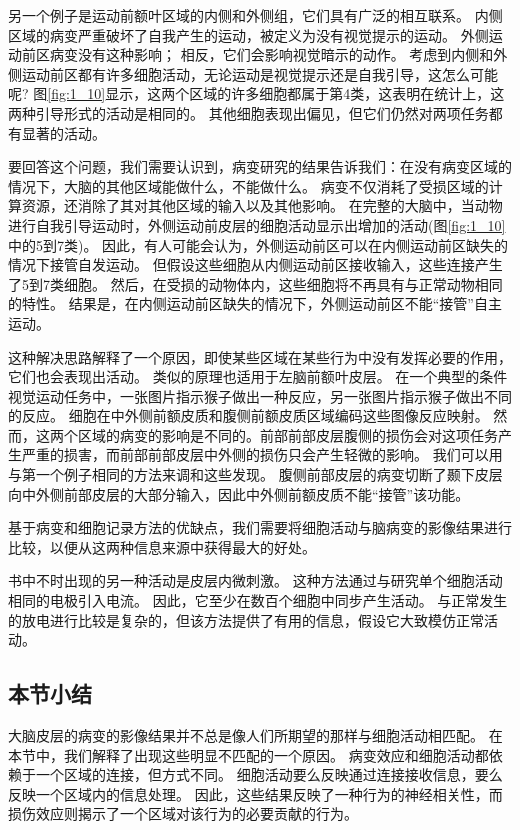 \par
另一个例子是运动前额叶区域的内侧和外侧组，它们具有广泛的相互联系\cite{luppino1993corticocortical}。
内侧区域的病变严重破坏了自我产生的运动，被定义为没有视觉提示的运动。
外侧运动前区病变没有这种影响\cite{thaler1995functions}；
相反，它们会影响视觉暗示的动作。
考虑到内侧和外侧运动前区都有许多细胞活动，无论运动是视觉提示还是自我引导，这怎么可能呢?
图\ref{fig:1_10}显示，这两个区域的许多细胞都属于第4类，这表明在统计上，这两种引导形式的活动是相同的。
其他细胞表现出偏见，但它们仍然对两项任务都有显著的活动。

\par
要回答这个问题，我们需要认识到，病变研究的结果告诉我们：在没有病变区域的情况下，大脑的其他区域能做什么，不能做什么。
病变不仅消耗了受损区域的计算资源，还消除了其对其他区域的输入以及其他影响。
在完整的大脑中，当动物进行自我引导运动时，外侧运动前皮层的细胞活动显示出增加的活动(图\ref{fig:1_10}中的5到7类)\cite{mushiake1991neuronal}。
因此，有人可能会认为，外侧运动前区可以在内侧运动前区缺失的情况下接管自发运动。
但假设这些细胞从内侧运动前区接收输入，这些连接产生了5到7类细胞。
然后，在受损的动物体内，这些细胞将不再具有与正常动物相同的特性。
结果是，在内侧运动前区缺失的情况下，外侧运动前区不能“接管”自主运动。

\par
这种解决思路解释了一个原因，即使某些区域在某些行为中没有发挥必要的作用，它们也会表现出活动。
类似的原理也适用于左脑前额叶皮层。
在一个典型的条件视觉运动任务中，一张图片指示猴子做出一种反应，另一张图片指示猴子做出不同的反应。
细胞在中外侧前额皮质和腹侧前额皮质区域编码这些图像反应映射\cite{asaad1998neural}。
然而，这两个区域的病变的影响是不同的。前部前部皮层腹侧的损伤会对这项任务产生严重的损害\cite{wang2000deficit}，而前部前部皮层中外侧的损伤只会产生轻微的影响\cite{petrides2019conditional}。
我们可以用与第一个例子相同的方法来调和这些发现。
腹侧前部皮层的病变切断了颞下皮层向中外侧前部皮层的大部分输入\cite{ungerleider1989projections}，因此中外侧前额皮质不能“接管”该功能。

\par
基于病变和细胞记录方法的优缺点，我们需要将细胞活动与脑病变的影像结果进行比较，以便从这两种信息来源中获得最大的好处。
\par
书中不时出现的另一种活动是皮层内微刺激。
这种方法通过与研究单个细胞活动相同的电极引入电流。
因此，它至少在数百个细胞中同步产生活动。
与正常发生的放电进行比较是复杂的，但该方法提供了有用的信息，假设它大致模仿正常活动。

\subsection{本节小结}
大脑皮层的病变的影像结果并不总是像人们所期望的那样与细胞活动相匹配。
在本节中，我们解释了出现这些明显不匹配的一个原因。
病变效应和细胞活动都依赖于一个区域的连接，但方式不同。
细胞活动要么反映通过连接接收信息，要么反映一个区域内的信息处理。
因此，这些结果反映了一种行为的神经相关性，而损伤效应则揭示了一个区域对该行为的必要贡献的行为。

